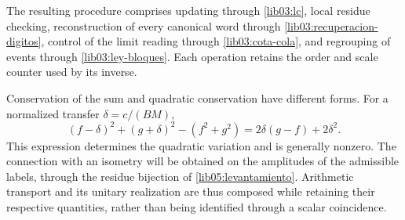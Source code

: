 The resulting procedure comprises updating through
\eqref{lib03:lc}, local residue checking, reconstruction of
every canonical word through \eqref{lib03:recuperacion-digitos},
control of the limit reading through \eqref{lib03:cota-cola}, and
regrouping of events through \eqref{lib03:ley-bloques}. Each
operation retains the order and scale counter used by its
inverse.

Conservation of the sum and quadratic conservation have different
forms. For a normalized transfer
\(\delta=c/(BM)\),
\begin{equation}
 (f-\delta)^2+(g+\delta)^2-(f^2+g^2)
 =2\delta(g-f)+2\delta^2.
 \label{lib03:variacion-cuadratica}
\end{equation}
This expression determines the quadratic variation and is generally
nonzero. The connection with an isometry will be obtained on the
amplitudes of the admissible labels, through the residue bijection of
\cref{lib05:levantamiento}. Arithmetic transport and its
unitary realization are thus composed while retaining their respective
quantities, rather than being identified through a scalar coincidence.
